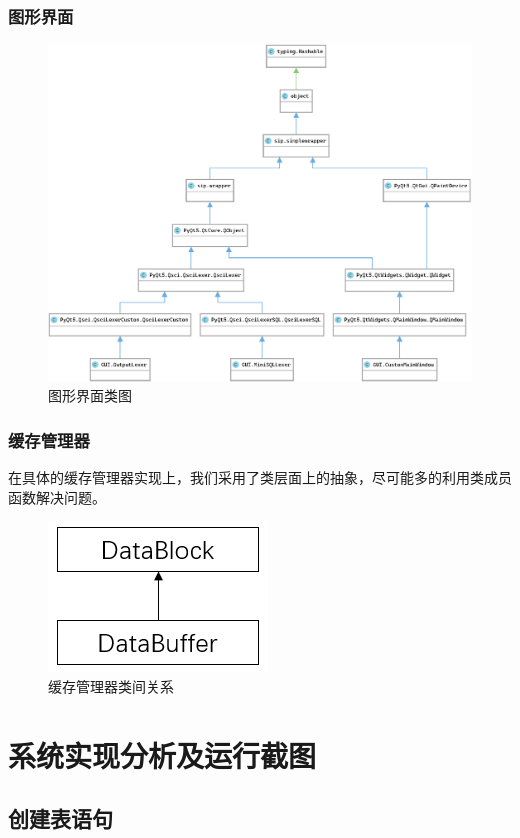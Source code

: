 \documentclass[UTF8]{ctexrep} %
\begin{document}
\subsection{图形界面}
\begin{figure}[H]
    \centering
    \includegraphics[width=\linewidth]{figure/gui_class.eps}
    \caption{图形界面类图}
    \label{fig:gui_class}
\end{figure}

\subsection{缓存管理器}
在具体的缓存管理器实现上，我们采用了类层面上的抽象，尽可能多的利用类成员函数解决问题。
\begin{figure}[H]
    \centering
    \includegraphics[width=0.25\linewidth]{figure/class1.jpg}
    \caption{缓存管理器类间关系}
    \label{fig:class1}
\end{figure}

\chapter{系统实现分析及运行截图}
\section{创建表语句}
\end{document}
